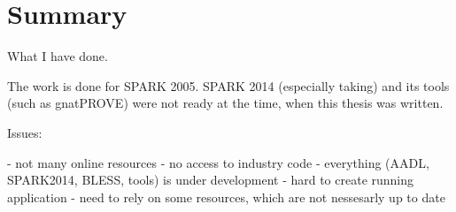 
\cleardoublepage


\chapter{Summary}
\label{summary}

What I have done.

The work is done for SPARK 2005. SPARK 2014 (especially taking) and its tools (such as gnatPROVE) were not ready at the time, when this thesis was written.

Issues:

- not many online resources
- no access to industry code
- everything (AADL, SPARK2014, BLESS, tools) is under development
- hard to create running application
- need to rely on some resources, which are not nessesarly up to date

